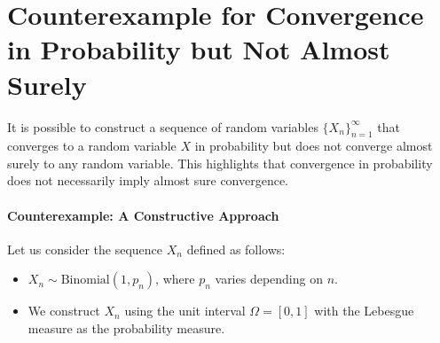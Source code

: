\section{Counterexample for Convergence in Probability but Not Almost Surely}

It is possible to construct a sequence of random variables \( \{X_n\}_{n=1}^\infty \) that converges to a random variable \( X \) in probability but does not converge almost surely to any random variable. This highlights that convergence in probability does not necessarily imply almost sure convergence.

\paragraph{Counterexample: A Constructive Approach}
Let us consider the sequence \( X_n \) defined as follows:
\begin{itemize}
    \item \( X_n \sim \text{Binomial}(1, p_n) \), where \( p_n \) varies depending on \( n \).
    \item We construct \( X_n \) using the unit interval \( \Omega = [0, 1] \) with the Lebesgue measure as the probability measure.
\end{itemize}

